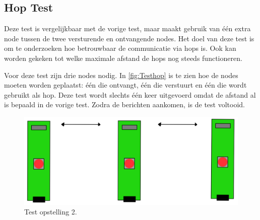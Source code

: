 \vspace{0.5cm}

\begin{figure}[ht]
    \centering
\end{figure}

\newpage
\subsection{Hop Test}
Deze test is vergelijkbaar met de vorige test, maar maakt gebruik van één extra node tussen de twee versturende en ontvangende nodes. Het doel van deze test is om te onderzoeken hoe betrouwbaar de communicatie via hops is. Ook kan worden gekeken tot welke maximale afstand de hops nog steeds functioneren.

Voor deze test zijn drie nodes nodig. In \autoref{fig:Testhop} is te zien hoe de nodes moeten worden geplaatst: één die ontvangt, één die verstuurt en één die wordt gebruikt als hop. Deze test wordt slechts één keer uitgevoerd omdat de afstand al is bepaald in de vorige test. Zodra de berichten aankomen, is de test voltooid.
\begin{figure}[h]
    \centering
    \includegraphics[scale = 0.4]{img/test2.png}
    \caption{Test opstelling 2.}
    \label{fig:Testhop}
\end{figure}


